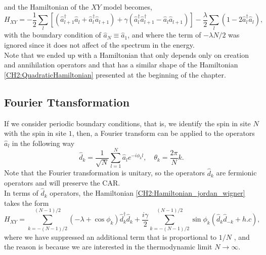 and the Hamiltonian of the $XY$ model becomes,
\begin{equation}
H_{X Y}=-\frac{1}{2} \sum_{l}\left[\left(\hat{a}_{l+1}^{\dagger} \hat{a}_{l}+\hat{a}_{l}^{\dagger} \hat{a}_{l+1}\right)+\gamma\left(\hat{a}_{l}^{\dagger} \hat{a}_{l+1}^{\dagger}-\hat{a}_{l} \hat{a}_{l+1}\right)\right]-\frac{\lambda}{2} \sum_{l}\left(1-2 \hat{a}_{l}^{\dagger} \hat{a}_{l}\right),
\label{CH2:Hamiltonian_jordan_wigner}
\end{equation}
with the boundary condition of $\hat{a}_{N} \equiv \hat{a}_{1}$, and where the term of $-\lambda N/2$ was ignored since it does not affect of the spectrum in the energy\cite{reyes-lega_aspects_2016}.\\
\indent Note that we ended up with a Hamiltonian that only depends only on creation and annihilation operators and that has a similar shape of the Hamiltonian \eqref{CH2:QuadraticHamiltonian} presented at the beginning of the chapter.
\subsection{Fourier Ttansformation}
If we consider periodic boundary conditions, that is, we identify the spin in site $N$ with the spin in site $1$, then, a Fourier transform can be applied to the operators $\hat{a}_{l}$ in the following way  \cite{reyes-lega_aspects_2016}
\begin{equation}
\hat{d}_{k}=\frac{1}{\sqrt{N}} \sum_{l=1}^{N} \hat{a}_{l} e^{-i \phi_{k} l}, \quad \theta_{k}=\frac{2 \pi}{N} k.
\end{equation}
Note that the Fourier transformation is unitary, so the operators $\hat{d}_k$ are fermionic operators and will preserve the CAR.\\
In terms of $\hat{d}_k$ operators, the Hamiltonian \eqref{CH2:Hamiltonian_jordan_wigner} takes the form
\begin{equation}
H_{X Y}=\sum_{k=-(N-1) / 2}^{(N-1) / 2}\left(-\lambda+\cos \phi_{k}\right) \hat{d}_{k}^{\dagger} \hat{d}_{k}+\frac{i \gamma}{2} \sum_{k=-(N-1) / 2}^{(N-1) / 2} \sin \phi_{k}\left(\hat{d}_{k} \hat{d}_{-k}+h . c\right),
\end{equation}
where we have suppressed an additional term that is proportional to $1/N$ \cite{barouch_statistical_1970, barouch_statistical_1971}, and the reason is because we are interested in the thermodynamic limit $N\to \infty$.
